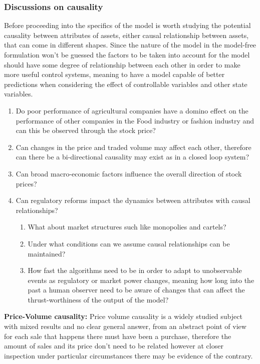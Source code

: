 \subsubsection{Discussions on causality}
Before proceeding into the specifics of the model is worth studying the potential causality between attributes of assets, either causal relationship between assets, that can come in different shapes. Since the nature of the model in the model-free formulation won't be guessed the factors to be taken into account for the model should have some degree of relationship between each other in order to make more useful control systems, meaning to have a model capable of better predictions when considering the effect of controllable variables and other state variables.

\begin{enumerate}
    \item Do poor performance of agricultural companies have a domino effect on the performance of other companies in the Food industry or fashion industry and can this be observed through the stock price?
    \item Can changes in the price and traded volume may affect each other, therefore can there be a bi-directional causality may exist as in a closed loop system?
    \item Can broad macro-economic factors influence the overall direction of stock prices?
    \item Can regulatory reforms impact the dynamics between attributes with causal relationships?
    \begin{enumerate}
        \item What about market structures such like monopolies and cartels? 
        \item Under what conditions can we assume causal relationships can be maintained? 
        \item How fast the algorithms need to be in order to adapt to unobservable events as regulatory or market power changes, meaning how long into the past a human observer need to be aware of changes that can affect the thrust-worthiness of the output of the model?
    \end{enumerate}
\end{enumerate}   

\textbf{Price-Volume causality:} Price volume causality is a widely studied subject with mixed results and no clear general answer, from an abstract point of view for each sale that happens there must have been a purchase, therefore the amount of sales and its price don't need to be related however at closer inspection under particular circumstances there may be evidence of the contrary. 

